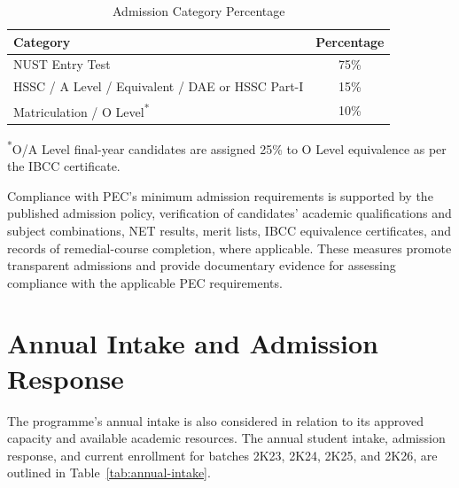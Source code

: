\begin{table}[H]
\centering
\caption{Admission Category Percentage}
\label{tab:admission-merit}
\begin{tabular}{@{}lc@{}}
\toprule
\textbf{Category} & \textbf{Percentage} \\
\midrule
NUST Entry Test & 75\% \\
HSSC / A Level / Equivalent / DAE or HSSC Part-I & 15\% \\
Matriculation / O Level\textsuperscript{*} & 10\% \\
\bottomrule
\end{tabular}
\vspace{0.4em}
\begin{minipage}{0.92\textwidth}
\footnotesize
\textsuperscript{*}O/A Level final-year candidates are assigned 25\% to O Level equivalence as per the IBCC certificate.
\end{minipage}
\end{table}

Compliance with PEC's minimum admission requirements is supported by the published admission policy, verification of candidates' academic qualifications and subject combinations, NET results, merit lists, IBCC equivalence certificates, and records of remedial-course completion, where applicable. These measures promote transparent admissions and provide documentary evidence for assessing compliance with the applicable PEC requirements. 

\section{Annual Intake and Admission Response}
\label{sec:annual-intake}
The programme's annual intake is also considered in relation to its approved capacity and available academic resources. The annual student intake, admission response, and current enrollment for batches 2K23, 2K24, 2K25, and 2K26, are outlined in Table~\ref{tab:annual-intake}. %





